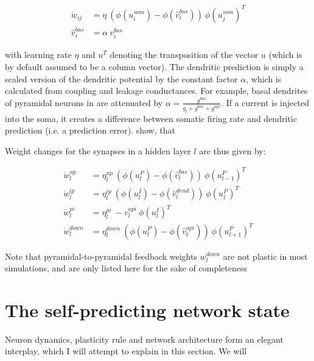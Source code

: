 \begin{align}
  \dot{w}_{ij}    & = \eta \ ( \phi(u_i^{som}) - \phi(\hat{v}_i^{bas}) ) \ \phi(u_j^{som})^T \\
  \hat{v}_i^{bas} & = \alpha \  v_i^{bas}
\end{align}

with learning rate $\eta$ and $u^T$ denoting the transposition of the vector $u$ (which is by default assumed to be
a column vector). The dendritic
prediction is simply a scaled version of the dendritic potential by the constant factor $\alpha$, which is calculated
from coupling and leakage conductances. For example, basal dendrites of pyramidal neurons in \cite{sacramento2018dendritic}
are attenuated by $\alpha = \frac{g^{bas}}{g_l + g^{bas} + g^{api}}$. If a current is injected into the soma, it creates 
a difference between somatic firing rate and dendritic prediction (i.e. a prediction error). \cite{urbanczik2014learning}
show, that 





Weight changes for the synapses in a hidden layer
$l$ are thus given by:

\begin{align}
  \dot{w}_{l}^{up}   & = \eta_l^{up} \ ( \phi(u_l^{P}) - \phi(\hat{v}_l^{bas}) ) \ \phi(u_{l-1}^{P})^T                     \\
  \dot{w}_{l}^{ip}   & = \eta_l^{ip} \ ( \phi(u_l^{I}) - \phi(\hat{v}_l^{dend}) ) \ \phi(u_{l}^{P})^T\label{eq-delta_w_ip} \\
  \dot{w}_{l}^{pi}   & = \eta_l^{pi} \ - v_l^{api} \ \phi(u_l^{I})^T\label{eq-delta_w_pi}                                  \\
  \dot{w}_{l}^{down} & = \eta_l^{down} \ ( \phi(u_l^{P}) - \phi(\hat{v}_l^{api}) )\ \phi(u_{l+1}^{P})^T
\end{align}

Note that pyramidal-to-pyramidal feedback weights $w_l^{down}$ are not plastic in most simulations, and are only listed
here for the sake of completeness 




\section{The self-predicting network state}

Neuron dynamics, plasticity rule and network architecture form an elegant interplay, which I will attempt to \phrasing
explain in this section. We will 

